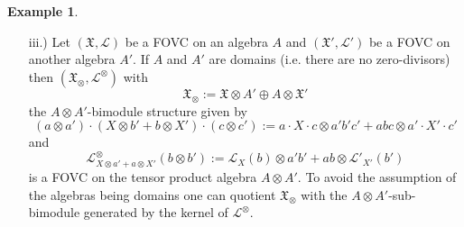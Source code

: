 \documentclass{article}
\theoremstyle{definition}
\newtheorem{example}[thm]{Example}
\begin{document}
\begin{example}
\begin{enumerate}
			Braided derivations in the context of triangular Hopf algebras are further appearing in \cite{AschieriLandiPagani}.
			For a cocommutative Hopf algebra with $\mathcal{R}=1\otimes 1$ and a commutative left $H$-module algebra $A$ this recovers the previous example i.).
			Further note that any \textit{co}quasitriangular Hopf algebra $(H,\mathcal{R})$ can be seen as a braided-commutative left module algebra with respect to the quasitriangular Hopf algebra $H^\circ_\mathrm{op}\otimes H^\circ$, where $H^\circ$ denotes the Hopf dual and $H^\circ_\mathrm{op}$ is the finite dual with opposite multiplication. This is spelled out in \cite[Example 2.13]{paolo} for the cotriangular case and easily generalizes to the coquasitriangular setting.
			
			
			\item[iii.)] Let $(\mathfrak{X},\mathscr{L})$ be a FOVC on an algebra $A$ and $(\mathfrak{X}',\mathscr{L}')$ be a FOVC on another algebra $A'$. If $A$ and $A'$ are domains (i.e. there are no zero-divisors) then $(\mathfrak{X}_\otimes,\mathscr{L}^\otimes)$ with 
			$$
			\mathfrak{X}_\otimes:=\mathfrak{X}\otimes A'\oplus A\otimes\mathfrak{X}'
			$$
			the $A\otimes A'$-bimodule structure given by %
			$$
			(a\otimes a')\cdot(X\otimes b'+b\otimes X')\cdot(c\otimes c')
			:=a\cdot X\cdot c\otimes a'b'c'+abc\otimes a'\cdot X'\cdot c'
			$$
			and
			$$
			\mathscr{L}^\otimes_{X\otimes a'+a\otimes X'}(b\otimes b')
			:=\mathscr{L}_X(b)\otimes a'b'+ab\otimes\mathscr{L}'_{X'}(b')
			$$
			is a FOVC on the tensor product algebra $A\otimes A'$. To avoid the assumption of the algebras being domains one can quotient $\mathfrak{X}_\otimes$ with the $A\otimes A'$-sub-bimodule generated by the kernel of $\mathscr{L}^\otimes$.
		\end{enumerate}
	\end{example}
	
	
\end{document}
